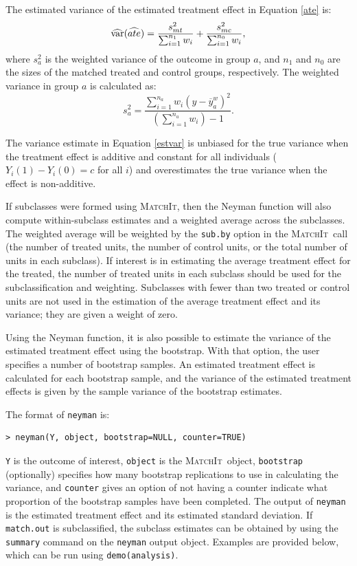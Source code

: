 \documentclass[oneside,letterpaper,titlepage]{article}
\newcommand{\MatchIt}{\textsc{MatchIt}}
\begin{document}
The estimated variance of the estimated treatment effect in Equation
\eqref{ate} is:
\begin{equation}
\label{estvar}
\widehat{{\rm var}}(\widehat{ate}) = \frac{s_{mt}^2}{\sum_{i=1}^{n_1} w_i} + \frac{s_{mc}^2}{\sum_{i=1}^{n_0} w_i},
\end{equation}
where $s_a^2$ is the weighted variance of the outcome in group $a$,
and $n_1$ and $n_0$ are the sizes of the matched treated and control
groups, respectively.  The weighted variance in group $a$ is
calculated as:
$$s^2_{a} = \frac{\sum_{i=1}^{n_a} w_i
  (y-\overline{y}_a^w)^2}{(\sum_{i=1}^{n_a} w_i) - 1}.$$

The variance estimate in Equation \eqref{estvar} is unbiased for the
true variance when the treatment effect is additive and constant for
all individuals ($Y_i(1)-Y_i(0)=c$ for all $i$) and overestimates the
true variance when the effect is non-additive.

If subclasses were formed using \MatchIt, then the Neyman function
will also compute within-subclass estimates and a weighted average
across the subclasses.  The weighted average will be weighted by the
{\tt sub.by} option in the \MatchIt\ call (the number of treated units,
the number of control units, or the total number of units in each
subclass).  If interest is in estimating the average treatment effect
for the treated, the number of treated units in each subclass should
be used for the subclassification and weighting.  Subclasses with
fewer than two treated or control units are not used in the estimation
of the average treatment effect and its variance; they are given a
weight of zero.

Using the Neyman function, it is also possible to estimate the
variance of the estimated treatment effect using the bootstrap.  With
that option, the user specifies a number of bootstrap samples.  An
estimated treatment effect is calculated for each bootstrap sample,
and the variance of the estimated treatment effects is given by the
sample variance of the bootstrap estimates.  

The format of {\tt neyman} is:

\begin{verbatim}
> neyman(Y, object, bootstrap=NULL, counter=TRUE)
\end{verbatim}

{\tt Y} is the outcome of interest, {\tt object} is the \MatchIt\ 
object, {\tt bootstrap} (optionally) specifies how many bootstrap
replications to use in calculating the variance, and {\tt counter}
gives an option of not having a counter indicate what proportion of
the bootstrap samples have been completed.  The output of {\tt neyman}
is the estimated treatment effect and its estimated standard
deviation.  If {\tt match.out} is subclassified, the subclass
estimates can be obtained by using the {\tt summary} command on the
{\tt neyman} output object.  Examples are provided below, which can be
run using {\tt demo(analysis)}.
\end{document}
